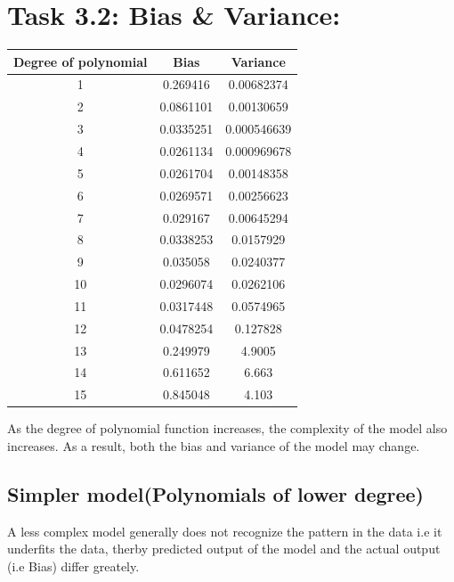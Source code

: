 \documentclass{article}
\begin{document}
\section{Task 3.2: Bias \& Variance:}
\begin{center}
    \begin{tabular}{|c|c|c|}
        \hline
        Degree of polynomial & Bias      & Variance    \\
        \hline
        1                    & 0.269416  & 0.00682374   \\
        2                    & 0.0861101 & 0.00130659   \\
        3                    & 0.0335251 & 0.000546639  \\
        4                    & 0.0261134 & 0.000969678  \\
        5                    & 0.0261704 & 0.00148358   \\
        6                    & 0.0269571 & 0.00256623   \\
        7                    & 0.029167  & 0.00645294   \\
        8                    & 0.0338253 & 0.0157929    \\
        9                    & 0.035058  & 0.0240377    \\
        10                   & 0.0296074 & 0.0262106    \\
        11                   & 0.0317448 & 0.0574965    \\
        12                   & 0.0478254 & 0.127828 \\
        13                   & 0.249979  & 4.9005   \\
        14                   & 0.611652  & 6.663    \\
        15                   & 0.845048  & 4.103    \\
        \hline
    \end{tabular}
\end{center}
As the degree of polynomial function increases, the complexity of the model also increases. As a result, both the bias and variance of the model may change.

\pagebreak
\subsection{Simpler model(Polynomials of lower degree)}

A less complex model generally does not recognize the pattern in the data i.e it underfits the data, therby predicted output of the model and the actual output (i.e Bias) differ greately.
\end{document}
